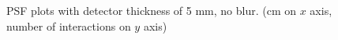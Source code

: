 \documentclass[a4paper]{article}
\begin{document}
\begin{figure}[H]
  \caption{PSF plots with detector thickness of 5 mm, no blur. (cm on $x$ axis, number of interactions on $y$ axis)}
  \label{fig:050_xs}
\end{figure}
\end{document}
